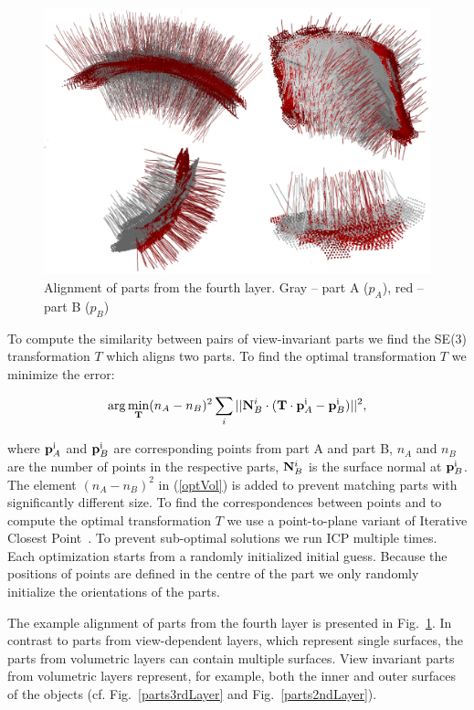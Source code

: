\documentclass[letterpaper,10pt,conference]{ieeeconf}  %
\begin{document}
\begin{figure}[t]
 \centering
\includegraphics[width=0.95\columnwidth]{../images/viParts.eps}
\caption{Alignment of parts from the fourth layer. Gray -- part A ($p_A$), red -- part B ($p_B$)}
 \label{viParts}
\end{figure}

To compute the similarity between pairs of view-invariant parts we find the SE(3) transformation $T$ which aligns two parts. To find the optimal transformation $T$ we minimize the error:

\begin{equation}
\label{optVol}
 \arg\min_{\bf T} (n_A-n_B)^2 \sum_i ||{\bf N}_B^i \cdot ({\bf T}\cdot {\bf p}_A^{\rm i}-{\bf p}_B^{\rm i})||^2,
\end{equation}

where ${\bf p}_A^{\rm i}$ and ${\bf p}_B^{\rm i}$ are corresponding points from part A and part B, $n_A$ and $n_B$ are the number of points in the respective parts, ${\bf N}_B^i$ is the surface normal at ${\bf p}_B^{\rm i}$. The element $(n_A-n_B)^2$ in (\ref{optVol}) is added to prevent matching parts with significantly different size. To find the correspondences between points and to compute the optimal transformation $T$ we use a point-to-plane variant of Iterative Closest Point~\cite{Segal2009}. To prevent sub-optimal solutions we run ICP multiple times. Each optimization starts from a randomly initialized initial guess. Because the positions of points are defined in the centre of the part we only randomly initialize the orientations of the parts. 

The example alignment of parts from the fourth layer is presented in Fig.~\ref{viParts}. In contrast to parts from view-dependent layers, which represent single surfaces, the parts from volumetric layers can contain multiple surfaces. View invariant parts from volumetric layers represent, for example, both the inner and outer surfaces of the objects (cf. Fig.~\ref{parts3rdLayer} and Fig.~\ref{parts2ndLayer}).
\end{document}
